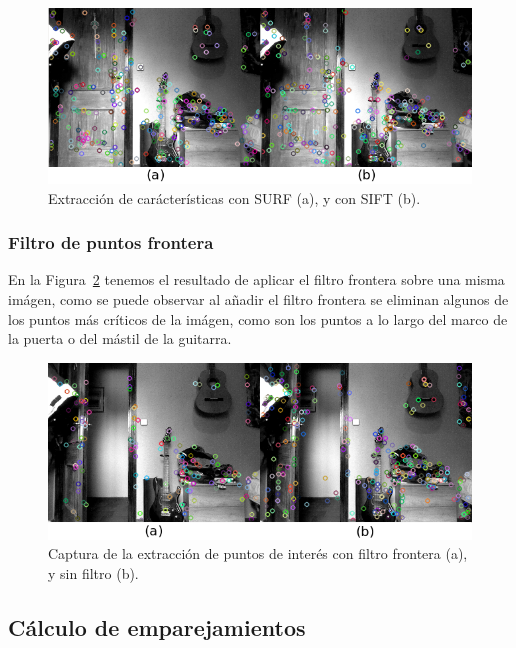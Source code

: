 \begin{figure}[th]
\centering
\includegraphics[scale=0.6]{Figures/tests/sift-surf.png}
\decoRule
\caption[Extracción de carácterísticas con SURF y con SIFT]{Extracción de carácterísticas con SURF (a), y con SIFT (b).}
\label{fig:sift-surf}
\end{figure}

\subsubsection{Filtro de puntos frontera}

En la Figura~\ref{fig:borderfilter} tenemos el resultado de aplicar el filtro frontera sobre una misma imágen, como se puede observar al añadir el filtro frontera se eliminan algunos de los puntos más críticos de la imágen, como son los puntos a lo largo del marco de la puerta o del mástil de la guitarra.

\begin{figure}[th]
\centering
\includegraphics[scale=0.7]{Figures/tests/borderfilter.png}
\decoRule
\caption[Captura de la extracción de puntos de interés con filtro frontera]{Captura de la extracción de puntos de interés con filtro frontera (a), y sin filtro (b).}
\label{fig:borderfilter}
\end{figure}

\subsection{Cálculo de emparejamientos}

